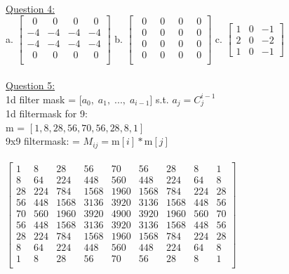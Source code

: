 \documentclass[12pt]{article}\usepackage{amsmath}
\begin{document}
\pagebreak\\
\underline{Question 4:}\\
a.
$\begin{bmatrix}
\;\; 0&\;\; 0&\;\; 0&\;\; 0\\
-4&-4&-4&-4\\
-4&-4&-4&-4\\
 \;\;0&\;\; 0&\;\; 0&\;\; 0\\
\end{bmatrix}$
b.
$\begin{bmatrix}
\;\; 0&\;\; 0&\;\; 0&\;\; 0\\
\;\; 0&\;\; 0&\;\; 0&\;\; 0\\
\;\; 0&\;\; 0&\;\; 0&\;\; 0\\
 \;\;0&\;\; 0&\;\; 0&\;\; 0\\
\end{bmatrix}$
c.
$\begin{bmatrix}
1 & 0 & -1\\
2 & 0 & -2\\
1 & 0 & -1
\end{bmatrix}$
\\\\
\underline{Question 5:}\\
1d filter mask = [$a_0,\; a_1,\; ...,\;a_{i-1}$] s.t. $a_j = C^{i-1}_j$\\
1d filtermask for 9:\\
m = $[ 1, 8, 28, 56, 70, 56, 28, 8, 1]$\\
9x9 filtermask: = $M_{ij} = $m$[i] * $m$[j]$\\\\
$\begin{bmatrix}
1&8&28&56&70&56&28&8&1\\
8&64&224&448&560&448&224&64&8\\
28&224&784&1568&1960&1568&784&224&28\\
56&448&1568&3136&3920&3136&1568&448&56\\
70&560&1960&3920&4900&3920&1960&560&70\\
56&448&1568&3136&3920&3136&1568&448&56\\
28&224&784&1568&1960&1568&784&224&28\\
8&64&224&448&560&448&224&64&8\\
1&8&28&56&70&56&28&8&1\\
\end{bmatrix}$
\end{document}
